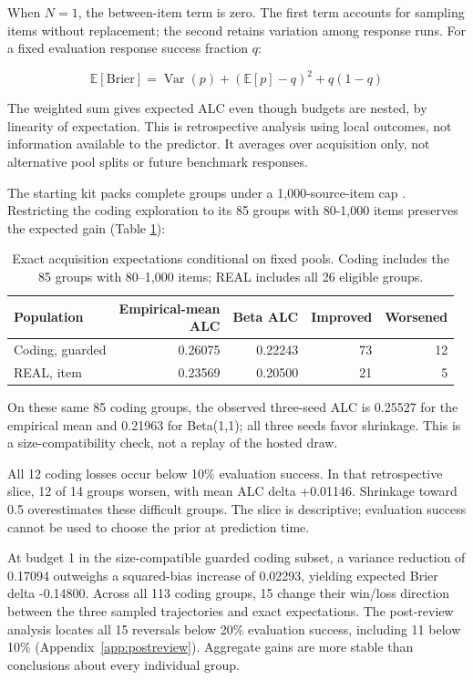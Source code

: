 \documentclass{article}
\begin{document}
When \(N=1\), the between-item term is zero. The first term accounts for sampling items without replacement; the second retains variation among response runs. For a fixed evaluation response success fraction \(q\):

\begin{equation}
\mathbb{E}[\mathrm{Brier}]=\operatorname{Var}(p)+(\mathbb{E}[p]-q)^2+q(1-q)
\end{equation}

The weighted sum gives expected ALC even though budgets are nested, by linearity of expectation. This is retrospective analysis using local outcomes, not information available to the predictor. It averages over acquisition only, not alternative pool splits or future benchmark responses.

The starting kit packs complete groups under a 1,000-source-item cap \cite{ref4}. Restricting the coding exploration to its 85 groups with 80-1,000 items preserves the expected gain (Table \ref{tab:expected}):

\begin{table}[ht]
\centering
\caption{Exact acquisition expectations conditional on fixed pools. Coding includes the 85 groups with 80--1,000 items; REAL includes all 26 eligible groups.}
\label{tab:expected}
\begin{tabular}{lrrrr}
\toprule
Population & \shortstack{Empirical-mean\\ALC} & Beta ALC & Improved & Worsened \\
\midrule
Coding, guarded & 0.26075 & 0.22243 & 73 & 12 \\
REAL, item & 0.23569 & 0.20500 & 21 & 5 \\
\bottomrule
\end{tabular}
\end{table}

On these same 85 coding groups, the observed three-seed ALC is 0.25527 for the empirical mean and 0.21963 for Beta(1,1); all three seeds favor shrinkage. This is a size-compatibility check, not a replay of the hosted draw.

All 12 coding losses occur below 10\% evaluation success. In that retrospective slice, 12 of 14 groups worsen, with mean ALC delta +0.01146. Shrinkage toward 0.5 overestimates these difficult groups. The slice is descriptive; evaluation success cannot be used to choose the prior at prediction time.

At budget 1 in the size-compatible guarded coding subset, a variance reduction of 0.17094 outweighs a squared-bias increase of 0.02293, yielding expected Brier delta -0.14800. Across all 113 coding groups, 15 change their win/loss direction between the three sampled trajectories and exact expectations. The post-review analysis locates all 15 reversals below 20\% evaluation success, including 11 below 10\% (Appendix~\ref{app:postreview}). Aggregate gains are more stable than conclusions about every individual group.
\end{document}
